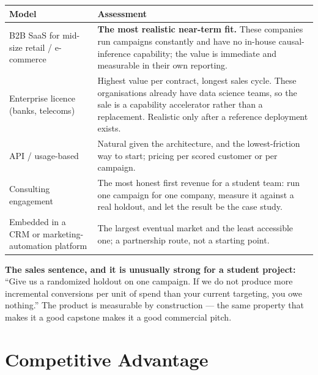 \documentclass[11pt,a4paper]{article}
\begin{document}
\begin{tabularx}{\textwidth}{@{}L{4.0cm}X@{}}
\toprule
\textbf{Model} & \textbf{Assessment} \\
\midrule
B2B SaaS for mid-size retail / e-commerce & \textbf{The most realistic near-term fit.} These
companies run campaigns constantly and have no in-house causal-inference capability; the value is
immediate and measurable in their own reporting. \\
Enterprise licence (banks, telecoms) & Highest value per contract, longest sales cycle. These
organisations already have data science teams, so the sale is a capability accelerator rather than a
replacement. Realistic only after a reference deployment exists. \\
API / usage-based & Natural given the architecture, and the lowest-friction way to start;
pricing per scored customer or per campaign. \\
Consulting engagement & The most honest first revenue for a student team: run one campaign for one
company, measure it against a real holdout, and let the result be the case study. \\
Embedded in a CRM or marketing-automation platform & The largest eventual market and the least
accessible one; a partnership route, not a starting point. \\
\bottomrule
\end{tabularx}

\begin{keybox}
\textbf{The sales sentence, and it is unusually strong for a student project:} ``Give us a
randomized holdout on one campaign. If we do not produce more incremental conversions per unit of
spend than your current targeting, you owe nothing.'' The product is measurable by construction ---
the same property that makes it a good capstone makes it a good commercial pitch.
\end{keybox}

\section{Competitive Advantage}
\end{document}
